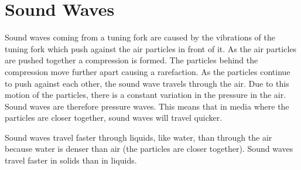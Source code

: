 \section{Sound Waves}
Sound waves coming from a tuning fork are caused by the vibrations of the tuning fork which push against the air particles in front of it. As the air particles are pushed together a compression is formed. The particles behind the compression move further apart causing a rarefaction. As the particles continue to push against each other, 
the sound wave travels through the air.
Due to this motion of the particles, there is a constant variation in the pressure in the air. Sound waves are therefore pressure waves. 
This means that in media where the particles are closer together, sound waves will travel quicker.


Sound waves travel faster through liquids, like water, than through the air because water is denser than air (the particles are closer together). Sound waves travel faster in solids than in liquids.

